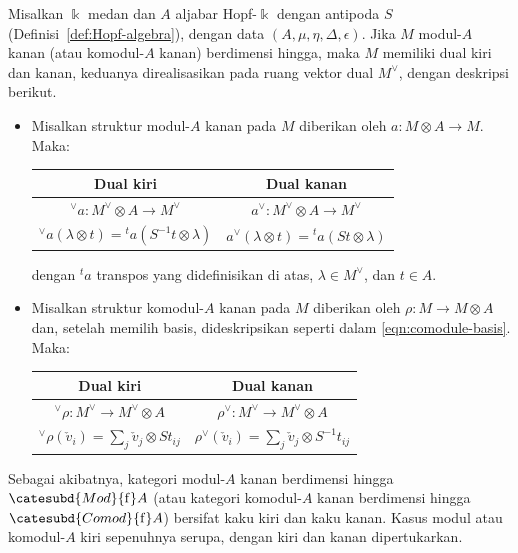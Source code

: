 \begin{proposition}\label{prop:Hopf-module-dual}
	Misalkan $\Bbbk$ medan dan $A$ aljabar Hopf-$\Bbbk$ dengan antipoda
	$S$ (Definisi~\ref{def:Hopf-algebra}), dengan data
	$(A,\mu,\eta,\Delta,\epsilon)$. Jika $M$ modul-$A$ kanan (atau
	komodul-$A$ kanan) berdimensi hingga, maka $M$ memiliki dual kiri dan
	kanan, keduanya direalisasikan pada ruang vektor dual $M^\vee$, dengan
	deskripsi berikut.
	\begin{itemize}
		\item Misalkan struktur modul-$A$ kanan pada $M$ diberikan oleh
		$a:M\otimes A\to M$. Maka:
		\begin{center}\begin{tabular}{|c|c|} \hline
			Dual kiri & Dual kanan \\ \hline
			${}^\vee a: M^\vee \otimes A \to M^\vee$ & $a^\vee: M^\vee \otimes A \to M^\vee$ \\
			${}^\vee a(\lambda \otimes t) = {}^t a\left( S^{-1} t \otimes \lambda\right)$ & $a^\vee(\lambda \otimes t) = {}^t a\left(St \otimes \lambda \right)$
			\\ \hline
		\end{tabular}\end{center}
		dengan ${}^ta$ transpos yang didefinisikan di atas,
		$\lambda\in M^\vee$, dan $t\in A$.
		\item Misalkan struktur komodul-$A$ kanan pada $M$ diberikan oleh
		$\rho:M\to M\otimes A$ dan, setelah memilih basis, dideskripsikan
		seperti dalam \eqref{eqn:comodule-basis}. Maka:
		\begin{center}\begin{tabular}{|c|c|} \hline
			Dual kiri & Dual kanan \\ \hline
			${}^\vee \rho: M^\vee \to M^\vee \otimes A$ & $\rho^\vee: M^\vee \to M^\vee \otimes A$ \\
			${}^\vee \rho (\check{v}_i) = \sum_j \check{v}_j \otimes St_{ij}$ & $\rho^\vee (\check{v}_i) = \sum_j \check{v}_j \otimes S^{-1} t_{ij}$
			\\ \hline
		\end{tabular}\end{center}
	\end{itemize}

	Sebagai akibatnya, kategori modul-$A$ kanan berdimensi hingga
	$\catesubd{Mod}{\mathrm f}A$ (atau kategori komodul-$A$ kanan
	berdimensi hingga $\catesubd{Comod}{\mathrm f}A$) bersifat kaku kiri
	dan kaku kanan. Kasus modul atau komodul-$A$ kiri sepenuhnya serupa,
	dengan kiri dan kanan dipertukarkan.
\end{proposition}
